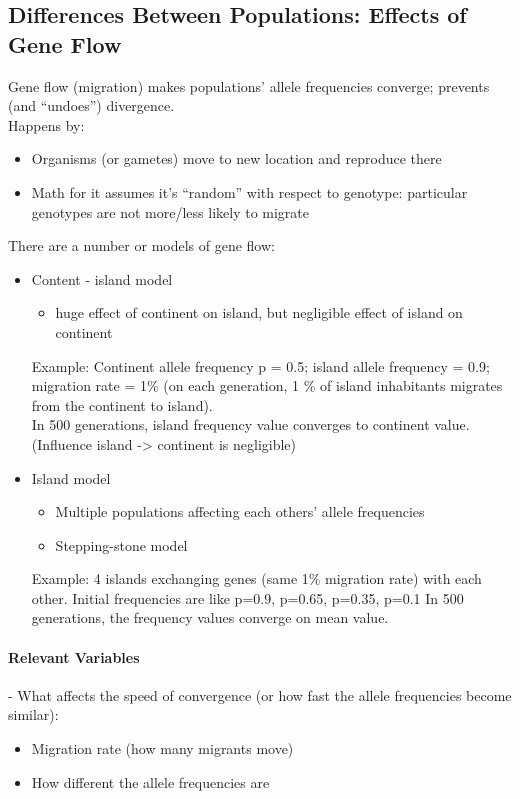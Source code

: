 \documentclass{scrartcl}
\begin{document}
\subsection{Differences Between Populations: Effects of Gene Flow}
\label{sec:06-5}
Gene flow (migration) makes populations' allele frequencies converge; prevents (and ``undoes'') divergence.\\
Happens by:
\begin{itemize}
\item Organisms (or gametes) move to new location and reproduce there
\item Math for it assumes it's ``random'' with respect to genotype: particular genotypes are not more/less likely to migrate
\end{itemize}
There are a number or models of gene flow:
\begin{itemize}
\item Content - island model
  \begin{itemize}
  \item huge effect of continent on island, but negligible effect of island on continent
  \end{itemize}
  Example: Continent allele frequency p = 0.5; island allele frequency = 0.9; migration rate = 1\% (on each generation, 1 \% of island inhabitants migrates from the continent to island).\\
  In 500 generations, island frequency value converges to continent value.
  (Influence island -> continent is negligible)
\item Island model
  \begin{itemize}
  \item Multiple populations affecting each others' allele frequencies
  \item Stepping-stone model
  \end{itemize}
  Example: 4 islands exchanging genes (same 1\% migration rate) with each other.
  Initial frequencies are like p=0.9, p=0.65, p=0.35, p=0.1
  In 500 generations, the frequency values converge on mean value.
\end{itemize}

\paragraph{Relevant Variables}
- What affects the speed of convergence (or how fast the allele frequencies become similar):
\begin{itemize}
\item Migration rate (how many migrants move)
\item How different the allele frequencies are
\end{itemize}
\end{document}
